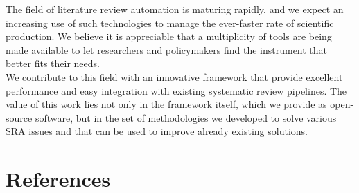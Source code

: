 \documentclass{article}
\begin{document}
The field of literature review automation is maturing rapidly, and we
expect an increasing use of such technologies to manage the ever-faster
rate of scientific production. We believe it is appreciable that a
multiplicity of tools are being made available to let researchers and
policymakers find the instrument that better fits their needs.\\
We contribute to this field with an innovative framework that provide
excellent performance and easy integration with existing systematic
review pipelines. The value of this work lies not only in the framework
itself, which we provide as open-source software, but in the set of
methodologies we developed to solve various SRA issues and that can be
used to improve already existing solutions.\\

\newpage

\hypertarget{references}{%
\section*{References}\label{references}}
\end{document}
